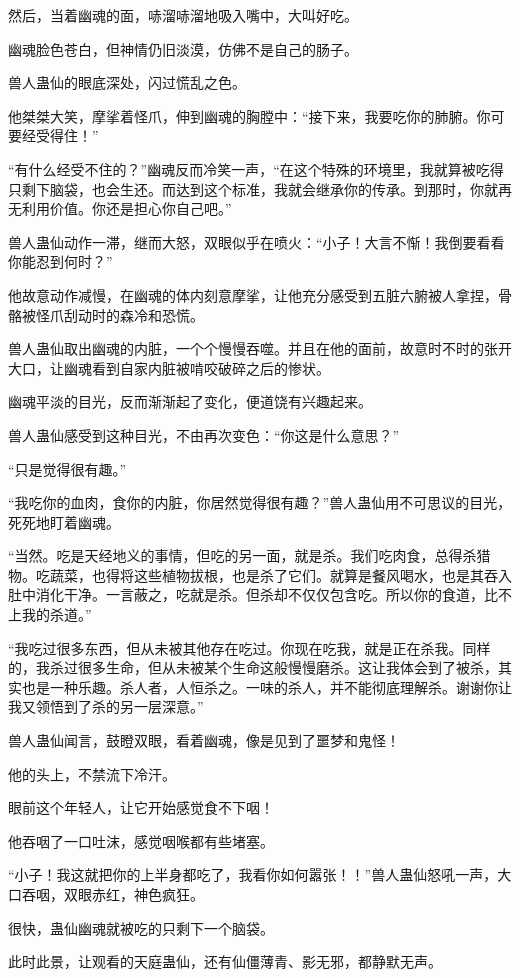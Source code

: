 \begin{this_body}
然后，当着幽魂的面，哧溜哧溜地吸入嘴中，大叫好吃。

幽魂脸色苍白，但神情仍旧淡漠，仿佛不是自己的肠子。

兽人蛊仙的眼底深处，闪过慌乱之色。

他桀桀大笑，摩挲着怪爪，伸到幽魂的胸膛中：“接下来，我要吃你的肺腑。你可要经受得住！”

“有什么经受不住的？”幽魂反而冷笑一声，“在这个特殊的环境里，我就算被吃得只剩下脑袋，也会生还。而达到这个标准，我就会继承你的传承。到那时，你就再无利用价值。你还是担心你自己吧。”

兽人蛊仙动作一滞，继而大怒，双眼似乎在喷火：“小子！大言不惭！我倒要看看你能忍到何时？”

他故意动作减慢，在幽魂的体内刻意摩挲，让他充分感受到五脏六腑被人拿捏，骨骼被怪爪刮动时的森冷和恐慌。

兽人蛊仙取出幽魂的内脏，一个个慢慢吞噬。并且在他的面前，故意时不时的张开大口，让幽魂看到自家内脏被啃咬破碎之后的惨状。

幽魂平淡的目光，反而渐渐起了变化，便道饶有兴趣起来。

兽人蛊仙感受到这种目光，不由再次变色：“你这是什么意思？”

“只是觉得很有趣。”

“我吃你的血肉，食你的内脏，你居然觉得很有趣？”兽人蛊仙用不可思议的目光，死死地盯着幽魂。

“当然。吃是天经地义的事情，但吃的另一面，就是杀。我们吃肉食，总得杀猎物。吃蔬菜，也得将这些植物拔根，也是杀了它们。就算是餐风喝水，也是其吞入肚中消化干净。一言蔽之，吃就是杀。但杀却不仅仅包含吃。所以你的食道，比不上我的杀道。”

“我吃过很多东西，但从未被其他存在吃过。你现在吃我，就是正在杀我。同样的，我杀过很多生命，但从未被某个生命这般慢慢磨杀。这让我体会到了被杀，其实也是一种乐趣。杀人者，人恒杀之。一味的杀人，并不能彻底理解杀。谢谢你让我又领悟到了杀的另一层深意。”

兽人蛊仙闻言，鼓瞪双眼，看着幽魂，像是见到了噩梦和鬼怪！

他的头上，不禁流下冷汗。

眼前这个年轻人，让它开始感觉食不下咽！

他吞咽了一口吐沫，感觉咽喉都有些堵塞。

“小子！我这就把你的上半身都吃了，我看你如何嚣张！！”兽人蛊仙怒吼一声，大口吞咽，双眼赤红，神色疯狂。

很快，蛊仙幽魂就被吃的只剩下一个脑袋。

此时此景，让观看的天庭蛊仙，还有仙僵薄青、影无邪，都静默无声。


\end{this_body}
